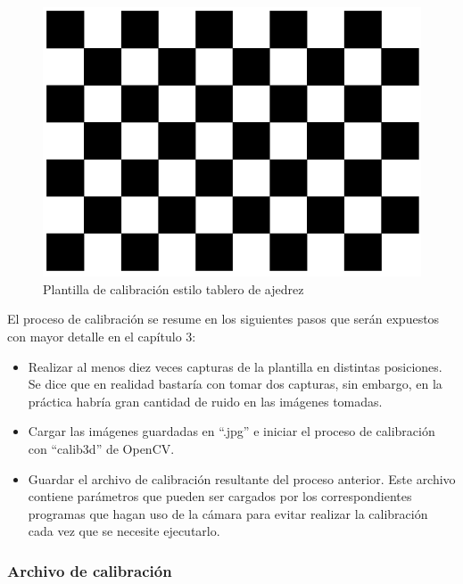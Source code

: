 \begin{figure}
\centering
\includegraphics[scale = 0.4]{capitulo_02/figuras_dir/CHESSBOARD.jpg}
\caption{Plantilla de calibración estilo tablero de ajedrez}
\end{figure}

El proceso de calibración se resume en los siguientes pasos que serán expuestos con mayor detalle en el capítulo 3:
\begin{itemize}
    \item Realizar al menos diez veces capturas de la plantilla en distintas posiciones. Se dice que en realidad bastaría con tomar dos capturas, sin embargo, en la práctica habría gran cantidad de ruido en las imágenes tomadas.
    \item Cargar las imágenes guardadas en ``.jpg'' e iniciar el proceso de calibración con ``calib3d'' de OpenCV.
    \item Guardar el archivo de calibración resultante del proceso anterior. Este archivo contiene parámetros que pueden ser cargados por los correspondientes programas que hagan uso de la cámara para evitar realizar la calibración cada vez que se necesite ejecutarlo.
\end{itemize}

\subsubsection{Archivo de calibración}\label{s2_2_3_2}

